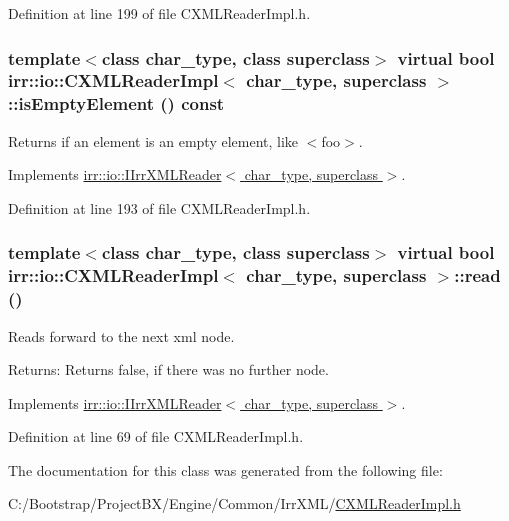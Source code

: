 Definition at line 199 of file CXMLReaderImpl.h.\hypertarget{classirr_1_1io_1_1_c_x_m_l_reader_impl_17154683d277084155fe6c5556cc0672}{
\subsubsection[{isEmptyElement}]{\setlength{\rightskip}{0pt plus 5cm}template$<$class char\_\-type, class superclass$>$ virtual bool {\bf irr::io::CXMLReaderImpl}$<$ char\_\-type, {\bf superclass} $>$::isEmptyElement () const}}
\label{classirr_1_1io_1_1_c_x_m_l_reader_impl_17154683d277084155fe6c5556cc0672}


Returns if an element is an empty element, like $<$foo$>$. 



Implements \hyperlink{classirr_1_1io_1_1_i_irr_x_m_l_reader_3c85b144e0376c9ff90bce1bbbc338a9}{irr::io::IIrrXMLReader$<$ char\_\-type, superclass $>$}.

Definition at line 193 of file CXMLReaderImpl.h.\hypertarget{classirr_1_1io_1_1_c_x_m_l_reader_impl_bc3c451a40c816ce74c846ebc2e71417}{
\subsubsection[{read}]{\setlength{\rightskip}{0pt plus 5cm}template$<$class char\_\-type, class superclass$>$ virtual bool {\bf irr::io::CXMLReaderImpl}$<$ char\_\-type, {\bf superclass} $>$::read ()}}
\label{classirr_1_1io_1_1_c_x_m_l_reader_impl_bc3c451a40c816ce74c846ebc2e71417}


Reads forward to the next xml node. \begin{Desc}
\item[Returns:]Returns false, if there was no further node. \end{Desc}


Implements \hyperlink{classirr_1_1io_1_1_i_irr_x_m_l_reader_157f458f7dabeeff173f72a0fb443a8e}{irr::io::IIrrXMLReader$<$ char\_\-type, superclass $>$}.

Definition at line 69 of file CXMLReaderImpl.h.

The documentation for this class was generated from the following file:\begin{CompactItemize}
\item 
C:/Bootstrap/ProjectBX/Engine/Common/IrrXML/\hyperlink{_c_x_m_l_reader_impl_8h}{CXMLReaderImpl.h}\end{CompactItemize}
